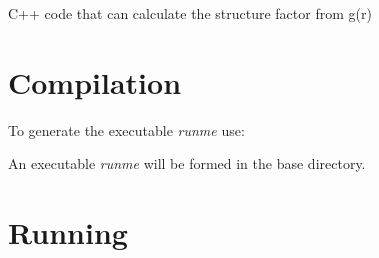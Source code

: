 C++ code that can calculate the structure factor from g(r)

\section*{Compilation}

To generate the executable {\itshape runme} use\+:


\begin{DoxyCode}{0}
\end{DoxyCode}


An executable {\itshape runme} will be formed in the base directory.

\section*{Running}


\begin{DoxyCode}{0}
\end{DoxyCode}
 